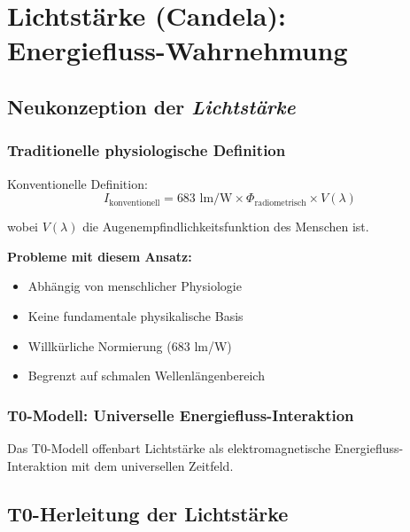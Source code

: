 	\section{Lichtstärke (Candela): Energiefluss-Wahrnehmung}
	\label{sec:candela_herleitung}
	
	\subsection{Neukonzeption der \textit{Lichtstärke}}
	\label{subsec:neukonzeption_lichtstaerke}
	
	\subsubsection{Traditionelle physiologische Definition}
	\label{subsubsec:traditionelle_lichtstaerke}
	
	Konventionelle Definition:
	\begin{equation}
		I_{\text{konventionell}} = 683 \text{ lm/W} \times \Phi_{\text{radiometrisch}} \times V(\lambda)
		\label{eq:konventionelle_candela}
	\end{equation}
	
	wobei $V(\lambda)$ die Augenempfindlichkeitsfunktion des Menschen ist.
	
	\textbf{Probleme mit diesem Ansatz:}
	\begin{itemize}
		\item Abhängig von menschlicher Physiologie
		\item Keine fundamentale physikalische Basis
		\item Willkürliche Normierung (683 lm/W)
		\item Begrenzt auf schmalen Wellenlängenbereich
	\end{itemize}
	
	\subsubsection{T0-Modell: Universelle Energiefluss-Interaktion}
	\label{subsubsec:t0_universeller_fluss}
	
	Das T0-Modell offenbart Lichtstärke als elektromagnetische Energiefluss-Interaktion mit dem universellen Zeitfeld.
	
	\subsection{T0-Herleitung der Lichtstärke}
	\label{subsec:t0_candela_herleitung}
	
